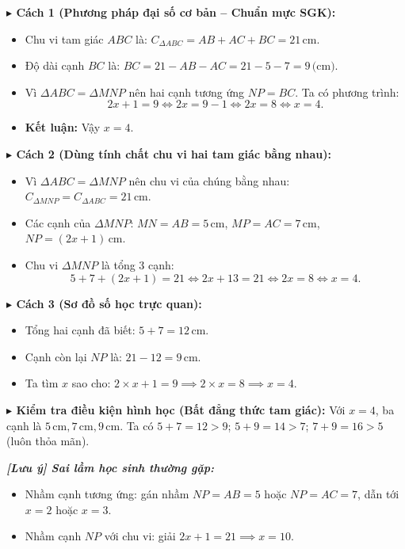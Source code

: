 \documentclass[12pt,a4paper]{article}
\begin{document}
\noindent\textbf{$\blacktriangleright$ Cách 1 (Phương pháp đại số cơ bản -- Chuẩn mực SGK):}
\begin{itemize}[leftmargin=16pt, itemsep=1.5pt, parsep=0pt]
  \item Chu vi tam giác $ABC$ là: $C_{\Delta ABC} = AB + AC + BC = 21\,\text{cm}$.
  \item Độ dài cạnh $BC$ là: $BC = 21 - AB - AC = 21 - 5 - 7 = 9\,\text{(cm)}$.
  \item Vì $\Delta ABC = \Delta MNP$ nên hai cạnh tương ứng $NP = BC$. Ta có phương trình:
  \[
    2x + 1 = 9 \iff 2x = 9 - 1 \iff 2x = 8 \iff x = 4.
  \]
  \item \textbf{Kết luận:} Vậy $x = 4$.
\end{itemize}

\noindent\textbf{$\blacktriangleright$ Cách 2 (Dùng tính chất chu vi hai tam giác bằng nhau):}
\begin{itemize}[leftmargin=16pt, itemsep=1.5pt, parsep=0pt]
  \item Vì $\Delta ABC = \Delta MNP$ nên chu vi của chúng bằng nhau: $C_{\Delta MNP} = C_{\Delta ABC} = 21\,\text{cm}$.
  \item Các cạnh của $\Delta MNP$: $MN = AB = 5\,\text{cm}$, $MP = AC = 7\,\text{cm}$, $NP = (2x + 1)\,\text{cm}$.
  \item Chu vi $\Delta MNP$ là tổng 3 cạnh:
  \[
    5 + 7 + (2x + 1) = 21 \iff 2x + 13 = 21 \iff 2x = 8 \iff x = 4.
  \]
\end{itemize}

\noindent\textbf{$\blacktriangleright$ Cách 3 (Sơ đồ số học trực quan):}
\begin{itemize}[leftmargin=16pt, itemsep=1.5pt, parsep=0pt]
  \item Tổng hai cạnh đã biết: $5 + 7 = 12\,\text{cm}$.
  \item Cạnh còn lại $NP$ là: $21 - 12 = 9\,\text{cm}$.
  \item Ta tìm $x$ sao cho: $2 \times x + 1 = 9 \implies 2 \times x = 8 \implies x = 4$.
\end{itemize}

\noindent\textbf{$\blacktriangleright$ Kiểm tra điều kiện hình học (Bất đẳng thức tam giác):}
Với $x = 4$, ba cạnh là $5\,\text{cm}, 7\,\text{cm}, 9\,\text{cm}$. Ta có $5 + 7 = 12 > 9$; $5 + 9 = 14 > 7$; $7 + 9 = 16 > 5$ (luôn thỏa mãn).

\noindent\textbf{\textit{\textbf{[Lưu ý]} Sai lầm học sinh thường gặp:}}
\begin{itemize}[leftmargin=16pt, itemsep=1pt, parsep=0pt]
  \item Nhầm cạnh tương ứng: gán nhầm $NP = AB = 5$ hoặc $NP = AC = 7$, dẫn tới $x = 2$ hoặc $x = 3$.
  \item Nhầm cạnh $NP$ với chu vi: giải $2x + 1 = 21 \implies x = 10$.
\end{itemize}
\end{document}
